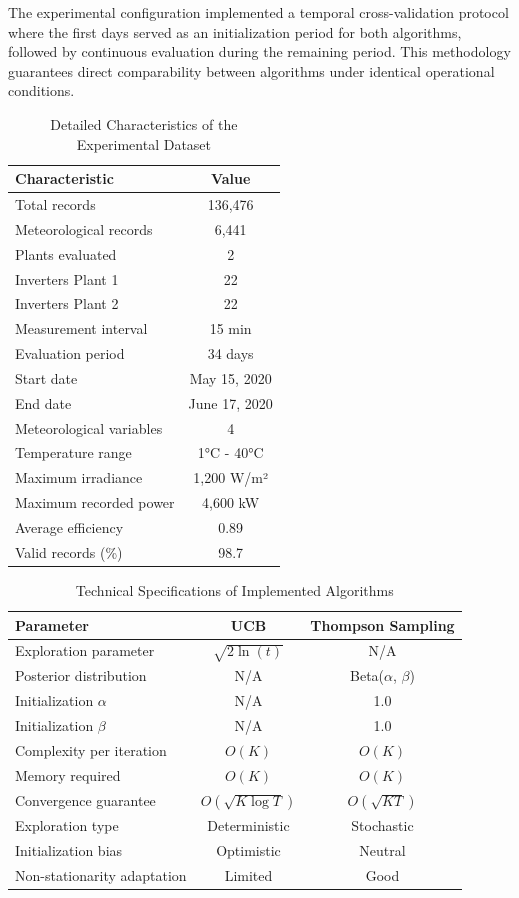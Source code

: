 \documentclass[conference]{IEEEtran}
\begin{document}
The experimental configuration implemented a temporal cross-validation protocol where the first days served as an initialization period for both algorithms, followed by continuous evaluation during the remaining period. This methodology guarantees direct comparability between algorithms under identical operational conditions.

\begin{table}[htb]
\centering
\caption{Detailed Characteristics of the Experimental Dataset}
\label{tab:dataset}
\begin{tabular}{lc}
\toprule
\textbf{Characteristic} & \textbf{Value} \\
\midrule
Total records & 136,476 \\
Meteorological records & 6,441 \\
Plants evaluated & 2 \\
Inverters Plant 1 & 22 \\
Inverters Plant 2 & 22 \\
Measurement interval & 15 min \\
Evaluation period & 34 days \\
Start date & May 15, 2020 \\
End date & June 17, 2020 \\
Meteorological variables & 4 \\
Temperature range & 1°C - 40°C \\
Maximum irradiance & 1,200 W/m² \\
Maximum recorded power & 4,600 kW \\
Average efficiency & 0.89 \\
Valid records (\%) & 98.7 \\
\bottomrule
\end{tabular}
\end{table}

\begin{table}[H]
\centering
\caption{Technical Specifications of Implemented Algorithms}
\label{tab:algorithm_specs}
\begin{tabular}{lcc}
\toprule
\textbf{Parameter} & \textbf{UCB} & \textbf{Thompson Sampling} \\
\midrule
Exploration parameter & $\sqrt{2\ln(t)}$ & N/A \\
Posterior distribution & N/A & Beta($\alpha$, $\beta$) \\
Initialization $\alpha$ & N/A & 1.0 \\
Initialization $\beta$ & N/A & 1.0 \\
Complexity per iteration & $O(K)$ & $O(K)$ \\
Memory required & $O(K)$ & $O(K)$ \\
Convergence guarantee & $O(\sqrt{K\log T})$ & $O(\sqrt{KT})$ \\
Exploration type & Deterministic & Stochastic \\
Initialization bias & Optimistic & Neutral \\
Non-stationarity adaptation & Limited & Good \\
\bottomrule
\end{tabular}
\end{table}
\end{document}
